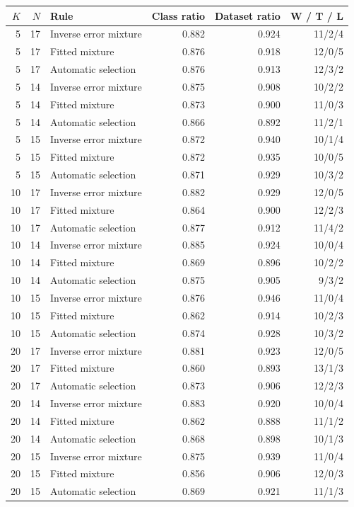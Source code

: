 \begin{tabular}{rrlrrr}
\toprule
$K$ & $N$ & Rule & Class ratio & Dataset ratio & W / T / L \\
\midrule
5 & 17 & Inverse error mixture & 0.882 & 0.924 & 11/2/4 \\
5 & 17 & Fitted mixture & 0.876 & 0.918 & 12/0/5 \\
5 & 17 & Automatic selection & 0.876 & 0.913 & 12/3/2 \\
5 & 14 & Inverse error mixture & 0.875 & 0.908 & 10/2/2 \\
5 & 14 & Fitted mixture & 0.873 & 0.900 & 11/0/3 \\
5 & 14 & Automatic selection & 0.866 & 0.892 & 11/2/1 \\
5 & 15 & Inverse error mixture & 0.872 & 0.940 & 10/1/4 \\
5 & 15 & Fitted mixture & 0.872 & 0.935 & 10/0/5 \\
5 & 15 & Automatic selection & 0.871 & 0.929 & 10/3/2 \\
10 & 17 & Inverse error mixture & 0.882 & 0.929 & 12/0/5 \\
10 & 17 & Fitted mixture & 0.864 & 0.900 & 12/2/3 \\
10 & 17 & Automatic selection & 0.877 & 0.912 & 11/4/2 \\
10 & 14 & Inverse error mixture & 0.885 & 0.924 & 10/0/4 \\
10 & 14 & Fitted mixture & 0.869 & 0.896 & 10/2/2 \\
10 & 14 & Automatic selection & 0.875 & 0.905 & 9/3/2 \\
10 & 15 & Inverse error mixture & 0.876 & 0.946 & 11/0/4 \\
10 & 15 & Fitted mixture & 0.862 & 0.914 & 10/2/3 \\
10 & 15 & Automatic selection & 0.874 & 0.928 & 10/3/2 \\
20 & 17 & Inverse error mixture & 0.881 & 0.923 & 12/0/5 \\
20 & 17 & Fitted mixture & 0.860 & 0.893 & 13/1/3 \\
20 & 17 & Automatic selection & 0.873 & 0.906 & 12/2/3 \\
20 & 14 & Inverse error mixture & 0.883 & 0.920 & 10/0/4 \\
20 & 14 & Fitted mixture & 0.862 & 0.888 & 11/1/2 \\
20 & 14 & Automatic selection & 0.868 & 0.898 & 10/1/3 \\
20 & 15 & Inverse error mixture & 0.875 & 0.939 & 11/0/4 \\
20 & 15 & Fitted mixture & 0.856 & 0.906 & 12/0/3 \\
20 & 15 & Automatic selection & 0.869 & 0.921 & 11/1/3 \\
\bottomrule
\end{tabular}
